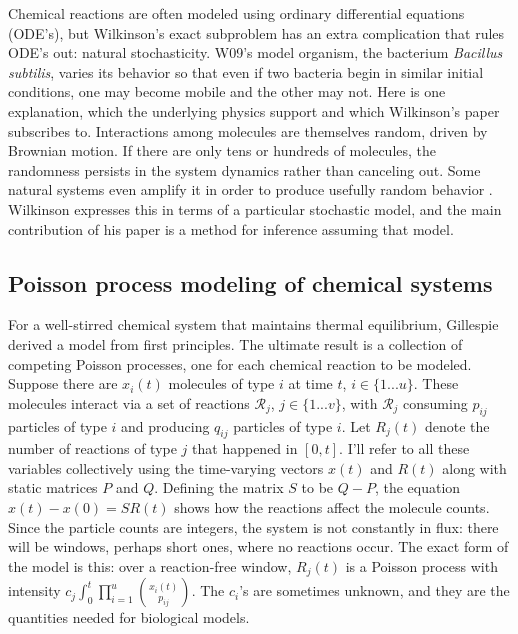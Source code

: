 \documentclass{article}
\begin{document}
Chemical reactions are often modeled using ordinary differential equations (ODE's), but Wilkinson's exact subproblem has an extra complication that rules ODE's out: natural stochasticity. W09's model organism, the bacterium {\it Bacillus subtilis}, varies its behavior so that even if two bacteria begin in similar initial conditions, one may become mobile and the other may not. Here is one explanation, which the underlying physics support and which  Wilkinson's paper subscribes to. Interactions among molecules are themselves random, driven by Brownian motion. If there are only tens or hundreds of molecules, the randomness persists in the system dynamics rather than canceling out. Some natural systems even amplify it in order to produce usefully random behavior \cite{reinker2006parameter}. Wilkinson expresses this in terms of a particular stochastic model, and the main contribution of his paper is a method for inference assuming that model.
 

\subsection{Poisson process modeling of chemical systems}

For a well-stirred chemical system that maintains thermal equilibrium, Gillespie  \cite{gillespie1992rigorous} derived a model from first principles. The ultimate result is a collection of competing Poisson processes, one for each chemical reaction to be modeled. Suppose there are $x_{i}(t)$ molecules of type $i$ at time $t$, $i\in \{1 ... u\}$. These molecules interact via a set of reactions $\mathcal{R}_{j}$, $j\in \{1 ... v\}$, with $\mathcal{R}_{j}$ consuming $p_{ij}$ particles of type $i$ and producing $q_{ij}$ particles of type $i$. Let $R_{j}(t)$ denote the number of reactions of type $j$ that happened in $[0,t]$. I'll refer to all these variables collectively using the time-varying vectors $x(t)$ and $R(t)$ along with static matrices $P$ and $Q$. Defining the matrix $S$ to be $Q-P$, the equation $x(t) - x(0) = SR(t)$ shows how the reactions affect the molecule counts. Since the particle counts are integers, the system is not constantly in flux: there will be windows, perhaps short ones, where no reactions occur. The exact form of the model is this: over a reaction-free window, $R_{j}(t)$ is a Poisson process with intensity $c_{j}\int_0^t \prod_{i=1}^u {{x_i(t)}\choose{p_{ij}}}$. %
The $c_{i}$'s are sometimes unknown, and they are the quantities needed for biological models.
\end{document}
